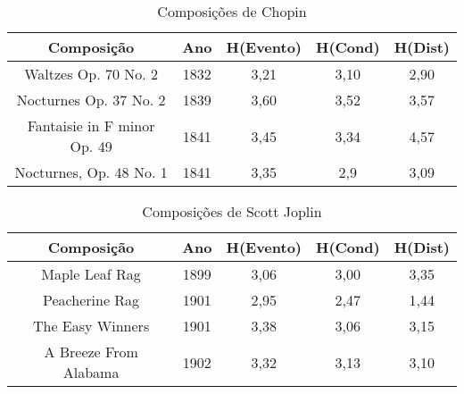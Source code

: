 \begin{table}[]
\centering
\caption{Composições de Chopin}
\begin{tabular}{|c|c|c|c|c|}
\hline
\rowcolor[HTML]{9B9B9B} 
{\color[HTML]{FFFFFF} Composição} & {\color[HTML]{FFFFFF} Ano} & {\color[HTML]{FFFFFF} H(Evento)} & {\color[HTML]{FFFFFF} H(Cond)} & {\color[HTML]{FFFFFF} H(Dist)} \\ \hline
Waltzes Op. 70 No. 2              & 1832                       & 3,21                             & 3,10                           & 2,90                           \\ \hline
Nocturnes Op. 37 No. 2            & 1839                       & 3,60                             & 3,52                           & 3,57                           \\ \hline
Fantaisie in F minor Op. 49       & 1841                       & 3,45                             & 3,34                           & 4,57                           \\ \hline
Nocturnes, Op. 48 No. 1           & 1841                       & 3,35                             & 2,9                            & 3,09                           \\ \hline
\end{tabular}
\end{table}

\begin{table}[]
\centering
\caption{Composições de Scott Joplin}
\begin{tabular}{|c|c|c|c|c|}
\hline
\rowcolor[HTML]{9B9B9B} 
{\color[HTML]{FFFFFF} Composição} & {\color[HTML]{FFFFFF} Ano} & {\color[HTML]{FFFFFF} H(Evento)} & {\color[HTML]{FFFFFF} H(Cond)} & {\color[HTML]{FFFFFF} H(Dist)} \\ \hline
Maple Leaf Rag                    & 1899                       & 3,06                             & 3,00                           & 3,35                           \\ \hline
Peacherine Rag                    & 1901                       & 2,95                             & 2,47                           & 1,44                           \\ \hline
The Easy Winners                  & 1901                       & 3,38                             & 3,06                           & 3,15                           \\ \hline
A Breeze From Alabama             & 1902                       & 3,32                             & 3,13                           & 3,10                           \\ \hline
\end{tabular}
\end{table}

